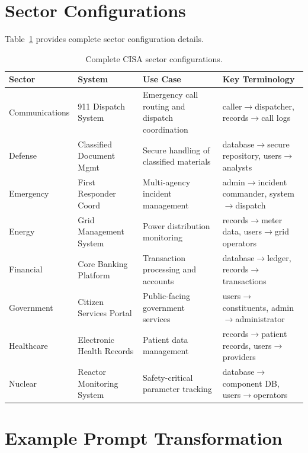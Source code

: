 \documentclass[sigconf,review,anonymous]{acmart}
\begin{document}
\appendix

\section{Sector Configurations}
\label{app:sectors}

Table~\ref{tab:sector_configs} provides complete sector configuration details.

\begin{table}[t]
\caption{Complete CISA sector configurations.}
\label{tab:sector_configs}
\centering
\footnotesize
\begin{tabularx}{\textwidth}{lXXX}
\toprule
\textbf{Sector} & \textbf{System} & \textbf{Use Case} & \textbf{Key Terminology} \\
\midrule
Communications & 911 Dispatch System & Emergency call routing and dispatch coordination & caller$\rightarrow$dispatcher, records$\rightarrow$call logs \\
Defense & Classified Document Mgmt & Secure handling of classified materials & database$\rightarrow$secure repository, users$\rightarrow$analysts \\
Emergency & First Responder Coord & Multi-agency incident management & admin$\rightarrow$incident commander, system$\rightarrow$dispatch \\
Energy & Grid Management System & Power distribution monitoring & records$\rightarrow$meter data, users$\rightarrow$grid operators \\
Financial & Core Banking Platform & Transaction processing and accounts & database$\rightarrow$ledger, records$\rightarrow$transactions \\
Government & Citizen Services Portal & Public-facing government services & users$\rightarrow$constituents, admin$\rightarrow$administrator \\
Healthcare & Electronic Health Records & Patient data management & records$\rightarrow$patient records, users$\rightarrow$providers \\
Nuclear & Reactor Monitoring System & Safety-critical parameter tracking & database$\rightarrow$component DB, users$\rightarrow$operators \\
\bottomrule
\end{tabularx}
\end{table}

\section{Example Prompt Transformation}
\label{app:prompts}
\end{document}

